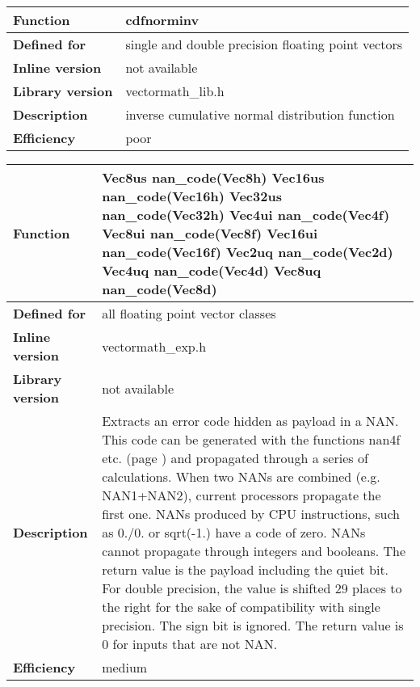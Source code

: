 \documentclass[vcl_manual.tex]{subfiles}
\begin{document}
\begin{tabular}{|p{30mm}|p{120mm}|}
\hline
\bfseries Function & cdfnorminv \\ \hline
\bfseries Defined for & single and double precision floating point vectors \\ \hline
\bfseries Inline version & not available \\ \hline
\bfseries Library version & vectormath\_lib.h \\ \hline
\bfseries Description & inverse cumulative normal distribution function \\ \hline
\bfseries Efficiency & poor \\ \hline
\end{tabular}

\label{nanCode}
\begin{tabular}{|p{30mm}|p{120mm}|}
\hline
\bfseries Function & 
Vec8us nan\_code(Vec8h)\newline
Vec16us nan\_code(Vec16h)\newline
Vec32us nan\_code(Vec32h)\newline
Vec4ui nan\_code(Vec4f)\newline
Vec8ui nan\_code(Vec8f)\newline
Vec16ui nan\_code(Vec16f)\newline
Vec2uq nan\_code(Vec2d)\newline
Vec4uq nan\_code(Vec4d)\newline
Vec8uq nan\_code(Vec8d) \\ \hline
\bfseries Defined for & all floating point vector classes \\ \hline
\bfseries Inline version & vectormath\_exp.h \\ \hline
\bfseries Library version & not available \\ \hline
\bfseries Description & Extracts an error code hidden as payload in a NAN. This code can be generated with the functions nan4f etc. (page \pageref{nan4f}) and propagated through a series of calculations. When two NANs are combined (e.g. NAN1+NAN2), current processors propagate the first one. NANs produced by CPU instructions, such as 0./0. or sqrt(-1.) have a code of zero. NANs cannot propagate through integers and booleans.\newline
The return value is the payload including the quiet bit. For double precision, the value is shifted 29 places to the right for the sake of compatibility with single precision.\newline
The sign bit is ignored.\newline
The return value is 0 for inputs that are not NAN. \\ \hline
\bfseries Efficiency & medium \\ \hline
\end{tabular}
\end{document}
